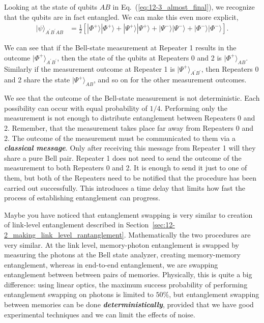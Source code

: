Looking at the state of qubits $AB$ in Eq.~(\ref{eq:12-3_almost_final}), we recognize that the qubits are in fact entangled.
We can make this even more explicit,
\begin{align}
    |\psi\rangle_{A^{\prime}B^{\prime}AB} & = \frac{1}{2} \left[ |\Phi^+\rangle |\Phi^+\rangle + |\Psi^+\rangle |\Psi^+\rangle + |\Psi^-\rangle |\Psi^-\rangle + |\Phi^-\rangle |\Phi^-\rangle \right].
    \label{eq:12-3_final}
\end{align}

We can see that if the Bell-state measurement at Repeater 1 results in the outcome $|\Phi^+\rangle_{A^{\prime}B^{\prime}}$, then the state of the qubits at Repeaters 0 and 2 is $|\Phi^+\rangle_{AB}$.
Similarly if the measurement outcome at Repeater 1 is $|\Psi^+\rangle_{A^{\prime}B^{\prime}}$, then Repeaters 0 and 2 share the state $|\Psi^+\rangle_{AB}$, and so on for the other measurement outcomes.

We see that the outcome of the Bell-state measurement is not deterministic.
Each possibility can occur with equal probability of $1/4$.
Performing only the measurement is not enough to distribute entanglement between Repeaters 0 and 2.
Remember, that the measurement takes place far away from Repeaters 0 and 2.
The outcome of the measurement must be communicated to them via a \emph{\textbf{classical message}}.
Only after receiving this message from Repeater 1 will they share a pure Bell pair.
Repeater 1 does not need to send the outcome of the measurement to both Repeaters 0 and 2.
It is enough to send it just to one of them, but both of the Repeaters need to be notified that the procedure has been carried out successfully.
This introduces a time delay that limits how fast the process of establishing entanglement can progress.

Maybe you have noticed that entanglement swapping is very similar to creation of link-level entanglement described in Section~\ref{sec:12-2_making_link_level_rantanglement}.
Mathematically the two procedures are very similar.
At the  link level, memory-photon entanglement is swapped by measuring the photons at the Bell state analyzer, creating memory-memory entanglement,
whereas in end-to-end entanglement, we are swapping entanglement between between pairs of memories.
Physically, this is quite a big difference: using linear optics, the maximum success probability of performing entanglement swapping on photons is limited to $50\%$, but entanglement swapping between memories can be done \textbf{\emph{deterministically}}, provided that we have good experimental techniques and we can limit the effects of noise.

